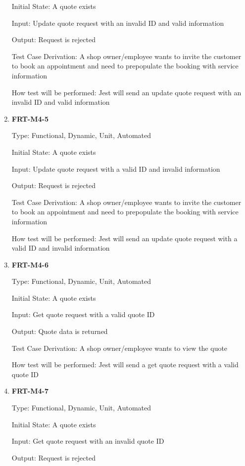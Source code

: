 \documentclass[12pt, titlepage]{article}
\begin{document}
\begin{enumerate}
	      Initial State: A quote exists

	      Input: Update quote request with an invalid ID and valid information

	      Output: Request is rejected

	      Test Case Derivation: A shop owner/employee wants to invite the customer to book an appointment and
	      need to prepopulate the booking with service information

	      How test will be performed: Jest will send an update quote request with an invalid ID and valid
	      information

	\item \textbf{FRT-M4-5}

	      Type: Functional, Dynamic, Unit, Automated

	      Initial State: A quote exists

	      Input: Update quote request with a valid ID and invalid information

	      Output: Request is rejected

	      Test Case Derivation: A shop owner/employee wants to invite the customer to book an appointment and
	      need to prepopulate the booking with service information

	      How test will be performed: Jest will send an update quote request with a valid ID and invalid
	      information

	\item \textbf{FRT-M4-6}

	      Type: Functional, Dynamic, Unit, Automated

	      Initial State: A quote exists

	      Input: Get quote request with a valid quote ID

	      Output: Quote data is returned

	      Test Case Derivation: A shop owner/employee wants to view the quote

	      How test will be performed: Jest will send a get quote request with a valid quote ID

	\item \textbf{FRT-M4-7}

	      Type: Functional, Dynamic, Unit, Automated

	      Initial State: A quote exists

	      Input: Get quote request with an invalid quote ID

	      Output: Request is rejected


\end{enumerate}
\end{document}
